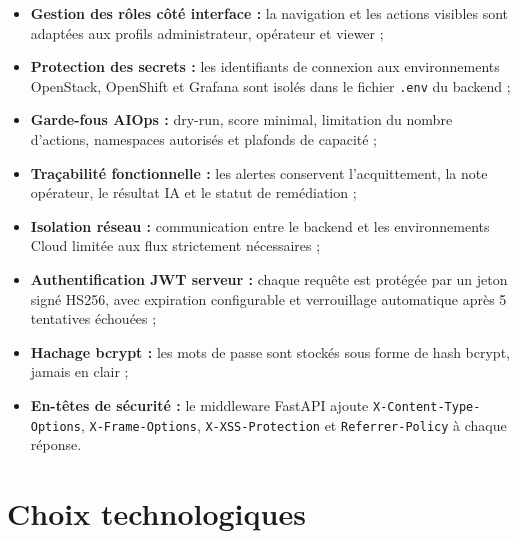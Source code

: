 \documentclass[11pt,a4paper]{report}
\begin{document}
\begin{itemize}[label=\textbullet, leftmargin=1.5cm, labelsep=0.5cm,
                itemsep=0.2em, parsep=0em, topsep=0.2em]
    \item \textbf{Gestion des rôles côté interface :} la navigation et les
    actions visibles sont adaptées aux profils administrateur, opérateur et
    viewer ;
    \item \textbf{Protection des secrets :} les identifiants de connexion aux
    environnements OpenStack, OpenShift et Grafana sont isolés dans le fichier
    \texttt{.env} du backend ;
    \item \textbf{Garde-fous AIOps :} dry-run, score minimal, limitation du
    nombre d'actions, namespaces autorisés et plafonds de capacité ;
    \item \textbf{Traçabilité fonctionnelle :} les alertes conservent
    l'acquittement, la note opérateur, le résultat IA et le statut de
    remédiation ;
    \item \textbf{Isolation réseau :} communication entre le backend et les
    environnements Cloud limitée aux flux strictement nécessaires ;
    \item \textbf{Authentification JWT serveur :} chaque requête est protégée
    par un jeton signé HS256, avec expiration configurable et verrouillage
    automatique après 5 tentatives échouées ;
    \item \textbf{Hachage bcrypt :} les mots de passe sont stockés sous forme
    de hash bcrypt, jamais en clair ;
    \item \textbf{En-têtes de sécurité :} le middleware FastAPI ajoute
    \texttt{X-Content-Type-Options}, \texttt{X-Frame-Options},
    \texttt{X-XSS-Protection} et \texttt{Referrer-Policy} à chaque réponse.
\end{itemize}

\section{Choix technologiques}
\end{document}
